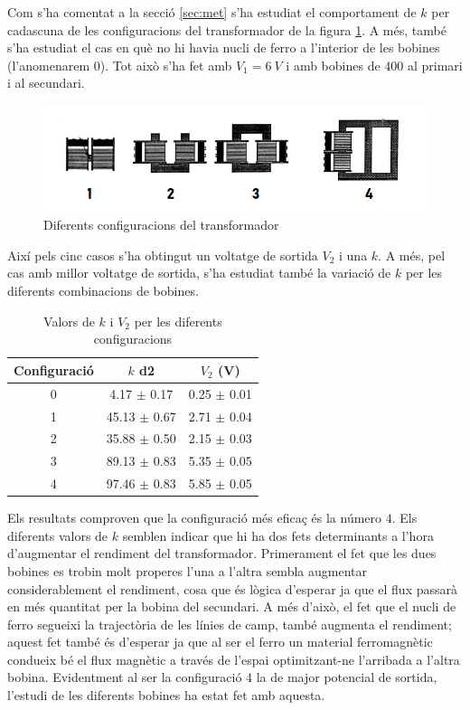 Com s'ha comentat a la secció \cref{sec:met} s'ha estudiat el comportament de $k$ per cadascuna de les configuracions del transformador de la figura \cref{fig:transfs}.
A més, també s'ha estudiat el cas en què no hi havia nucli de ferro a l'interior de les bobines (l'anomenarem $0$). Tot això s'ha fet amb $V_1=\SI{6}{V}$ i amb bobines de $400$ al primari i al secundari.

\begin{figure}
    \centering \small \sffamily
    \includegraphics{Transfs.png}
    \caption{Diferents configuracions del transformador}
    \label{fig:transfs}
\end{figure}

Així pels cinc casos s'ha obtingut un voltatge de sortida $V_2$ i una $k$. A més, pel cas amb millor voltatge de sortida, s'ha estudiat també la variació de $k$ per les diferents combinacions de bobines.

 \begin{table}[!htbp]
     \centering
     \caption{Valors de $k$ i $V_2$ per les diferents configuracions}
     \label{tab:k}
\begin{tabular}{SSS}
			\toprule
			{Configuració} & { $k$ \SI{d2}{}} & {$V_2$ (\si{V})}  \\
			 &  4.17 $\pm$ 0.17 & 0.25 $\pm$ 0.01 \\
			1 & 45.13 $\pm$ 0.67 & 2.71 $\pm$ 0.04 \\
			2 & 35.88 $\pm$ 0.50 & 2.15 $\pm$ 0.03 \\
			3 & 89.13 $\pm$ 0.83 & 5.35 $\pm$ 0.05 \\
			4 & 97.46 $\pm$ 0.83 & 5.85 $\pm$ 0.05 \\
			\bottomrule
\end{tabular}
\end{table}

Els resultats comproven que la configuració més eficaç és la número $4$. Els diferents valors de $k$ semblen indicar que hi ha dos fets determinants a l'hora d'augmentar el rendiment del transformador. Primerament el fet que les dues bobines es trobin molt properes l'una a l'altra sembla augmentar considerablement el rendiment, cosa que és lògica d'esperar ja que el flux passarà en més quantitat per la bobina del secundari. A més d'això, el fet que el nucli de ferro segueixi la trajectòria de les línies de camp, també augmenta el rendiment; aquest fet també és d'esperar ja que al ser el ferro un material ferromagnètic condueix bé el flux magnètic a través de l'espai optimitzant-ne l'arribada a l'altra bobina. Evidentment al ser la configuració $4$ la de major potencial de sortida, l'estudi de les diferents bobines ha estat fet amb aquesta.

